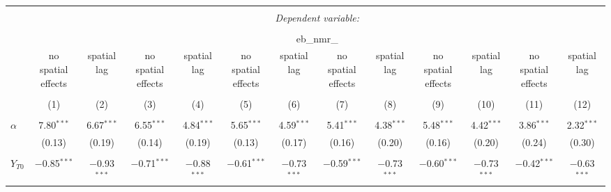 
\begin{sidewaystable}[!htbp] \centering 
  \caption{} 
  \label{} 
\begin{tabular}{@{\extracolsep{0.1pt}}lcccccccccccc} 
\\[-1.8ex]\hline 
\hline \\[-1.8ex] 
 & \multicolumn{12}{c}{\textit{Dependent variable:}} \\ 
\cline{2-13} 
\\[-1.8ex] & \multicolumn{12}{c}{eb\_nmr\_} \\ 
 & \shortstack{no spatial \\ effects} & \shortstack{spatial\\  lag} & \shortstack{no spatial \\ effects} & \shortstack{spatial\\  lag} & \shortstack{no spatial \\ effects} & \shortstack{spatial\\  lag} & \shortstack{no spatial \\ effects} & \shortstack{spatial\\  lag} & \shortstack{no spatial \\ effects} & \shortstack{spatial\\  lag} & \shortstack{no spatial \\ effects} & \shortstack{spatial\\  lag} \\ 
\\[-1.8ex] & (1) & (2) & (3) & (4) & (5) & (6) & (7) & (8) & (9) & (10) & (11) & (12)\\ 
\hline \\[-1.8ex] 
 $\alpha$ & 7.80$^{***}$ & 6.67$^{***}$ & 6.55$^{***}$ & 4.84$^{***}$ & 5.65$^{***}$ & 4.59$^{***}$ & 5.41$^{***}$ & 4.38$^{***}$ & 5.48$^{***}$ & 4.42$^{***}$ & 3.86$^{***}$ & 2.32$^{***}$ \\ 
  & (0.13) & (0.19) & (0.14) & (0.19) & (0.13) & (0.17) & (0.16) & (0.20) & (0.16) & (0.20) & (0.24) & (0.30) \\ 
  & & & & & & & & & & & & \\ 
 $Y_{T0}$ & $-$0.85$^{***}$ & $-$0.93$^{***}$ & $-$0.71$^{***}$ & $-$0.88$^{***}$ & $-$0.61$^{***}$ & $-$0.73$^{***}$ & $-$0.59$^{***}$ & $-$0.73$^{***}$ & $-$0.60$^{***}$ & $-$0.73$^{***}$ & $-$0.42$^{***}$ & $-$0.63$^{***}$ \\ 

\end{tabular}
\end{sidewaystable}
